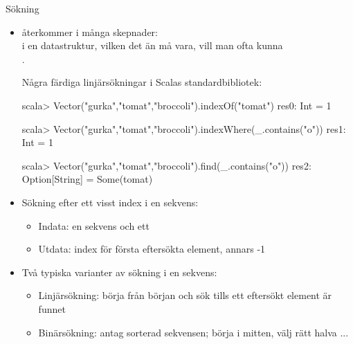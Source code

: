 



\begin{Slide}{Sökning}\SlideFontSmall

\begin{itemize}
\item {} återkommer i många skepnader: \\ i en datastruktur, vilken det än må vara, vill man ofta kunna \\ .

\pause
Några färdiga linjärsökningar i Scalas standardbibliotek:

\begin{REPL}
scala> Vector("gurka","tomat","broccoli").indexOf("tomat")
res0: Int = 1

scala> Vector("gurka","tomat","broccoli").indexWhere(_.contains("o"))
res1: Int = 1

scala> Vector("gurka","tomat","broccoli").find(_.contains("o"))
res2: Option[String] = Some(tomat)
\end{REPL}

\pause
\item Sökning efter ett visst index i en sekvens:

\begin{itemize}\SlideFontTiny
\item Indata: en sekvens och ett 
\item Utdata: index för första eftersökta element, annars -1
\end{itemize}

\pause
\item Två typiska varianter av sökning i en sekvens:
\begin{itemize}\SlideFontTiny
\item Linjärsökning: börja från början och sök tills ett eftersökt element är funnet
\item Binärsökning: antag sorterad sekvensen; börja i mitten, välj rätt halva ... 
\end{itemize}
\end{itemize}
\end{Slide}



